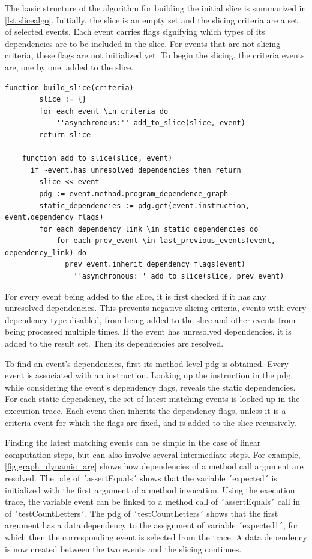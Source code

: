 The basic structure of the algorithm for building the initial slice is summarized in \cref{lst:slicealgo}.
Initially, the slice is an empty set and the slicing criteria are a set of selected events.
Each event carries flags signifying which types of its dependencies are to be included in the slice.
For events that are not slicing criteria, these flags are not initialized yet.
To begin the slicing, the criteria events are, one by one, added to the slice.

\begin{lstlisting}[float=t,language=algorithm,label=lst:slicealgo,caption={Simplified algorithm for building the slice}]
	function build_slice(criteria)
		slice := {}
		for each event \in criteria do
			''asynchronous:'' add_to_slice(slice, event)
		return slice
		
	function add_to_slice(slice, event)
	  if ~event.has_unresolved_dependencies then return
		slice << event
		pdg := event.method.program_dependence_graph
		static_dependencies := pdg.get(event.instruction, event.dependency_flags)
		for each dependency_link \in static_dependencies do
			for each prev_event \in last_previous_events(event, dependency_link) do
			  prev_event.inherit_dependency_flags(event)
				''asynchronous:'' add_to_slice(slice, prev_event)
\end{lstlisting}

For every event being added to the slice, it is first checked if it has any unresolved dependencies.
This prevents negative slicing criteria, events with every dependency type disabled, from being added to the slice and other events from being processed multiple times.
If the event has unresolved dependencies, it is added to the result set. 
Then its dependencies are resolved.

To find an event's dependencies, first its method-level \ac{pdg} is obtained.
Every event is associated with an instruction.
Looking up the instruction in the \ac{pdg}, while considering the event's dependency flags, reveals the static dependencies.
For each static dependency, the set of latest matching events is looked up in the execution trace.
Each event then inherits the dependency flags, unless it is a criteria event for which the flags are fixed, and is added to the slice recursively.

Finding the latest matching events can be simple in the case of linear computation steps, but can also involve several intermediate steps.
For example, \cref{fig:graph_dynamic_arg} shows how dependencies of a method call argument are resolved.
The \ac{pdg} of ´assertEquals´ shows that the variable ´expected´ is initialized with the first argument of a method invocation.
Using the execution trace, the variable event can be linked to a method call of ´assertEquals´ call in  of ´testCountLetters´.
The \ac{pdg} of ´testCountLetters´ shows that the first argument has a data dependency to the assignment of variable ´expected1´, for which then the corresponding event is selected from the trace.
A data dependency is now created between the two events and the slicing continues.

